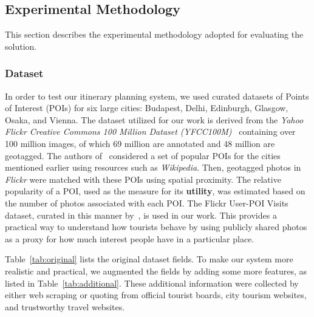 \subsection{Experimental Methodology}
This section describes the experimental methodology adopted for evaluating the \trip solution. 

\subsubsection{\textbf{Dataset}}
\label{sec:dataset}

In order to test our itinerary planning system, we used curated datasets of Points of Interest (POIs) for six large cities: Budapest, Delhi, Edinburgh, Glasgow, Osaka, and Vienna. 
The dataset utilized for our work is derived from the \emph{Yahoo Flickr Creative Commons 100 Million Dataset (YFCC100M)}~\citep{taylor2018tour} containing over 100 million images, of which 69 million are annotated and 48 million are geotagged.
%
The authors of~\citep{taylor2018tour} considered a set of popular POIs for the cities mentioned earlier using resources such as \emph{Wikipedia}. Then, geotagged photos in \emph{Flickr} were matched with these POIs using spatial proximity. The relative popularity of a POI, used as the measure for its \textbf{utility}, was estimated based on the number of photos associated with each POI. The Flickr User-POI Visits dataset, curated in this manner by~\citep{limkwanhuiDataCode}, is used in our work.
This provides a practical way to understand how tourists behave by using publicly shared photos as a proxy for how much interest people have in a particular place.

Table~\ref{tab:original} lists the original dataset fields. To make our system
more realistic and practical, we augmented the fields by adding some more
features, as listed in Table~\ref{tab:additional}.  These additional information
were collected by either web scraping or quoting from official tourist boards,
city tourism websites, and trustworthy travel websites.

